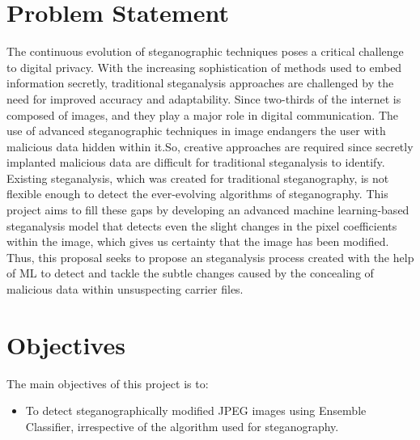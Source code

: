 \clearpage
\section{Problem Statement} 
The continuous evolution of steganographic techniques poses a critical challenge to digital privacy. With the increasing sophistication of methods used to embed information secretly, traditional steganalysis approaches are challenged by the need for improved accuracy and adaptability. Since two-thirds of the internet is composed of images, and they play a major role in digital communication. The use of advanced steganographic techniques in image endangers the user with malicious data hidden within it.So, creative approaches are required since secretly implanted malicious data are difficult for traditional steganalysis to identify. Existing steganalysis, which was created for traditional steganography, is not flexible enough to detect the ever-evolving algorithms of steganography. This project aims to fill these gaps by developing an advanced machine learning-based steganalysis model that detects even the slight changes in the pixel coefficients within the image, which gives us certainty that the image has been modified. Thus, this proposal seeks to propose an steganalysis process created with the help of ML to detect and tackle the subtle changes caused by the concealing of malicious data within unsuspecting carrier files.\\
\section{Objectives}
The main objectives of this project is to:
\begin{itemize}
\item  To detect steganographically modified JPEG images using Ensemble Classifier, irrespective of the algorithm used for steganography. 

\end{itemize}

